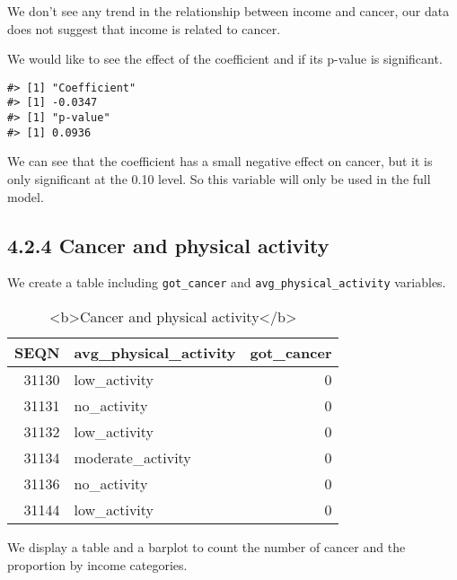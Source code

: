 \documentclass[
]{article}
\begin{document}
We don't see any trend in the relationship between income and cancer,
our data does not suggest that income is related to cancer.

We would like to see the effect of the coefficient and if its p-value is
significant.

\begin{verbatim}
#> [1] "Coefficient"
#> [1] -0.0347
#> [1] "p-value"
#> [1] 0.0936
\end{verbatim}

We can see that the coefficient has a small negative effect on cancer,
but it is only significant at the 0.10 level. So this variable will only
be used in the full model.

\hypertarget{cancer-and-physical-activity}{%
\subsection{4.2.4 Cancer and physical
activity}\label{cancer-and-physical-activity}}

We create a table including \texttt{got\_cancer} and
\texttt{avg\_physical\_activity} variables.

\begin{table}

\caption{\label{tab:unnamed-chunk-102}<b>Cancer and physical activity</b>}
\centering
\begin{tabular}[t]{r|l|r}
\hline
SEQN & avg\_physical\_activity & got\_cancer\\
\hline
31130 & low\_activity & 0\\
\hline
31131 & no\_activity & 0\\
\hline
31132 & low\_activity & 0\\
\hline
31134 & moderate\_activity & 0\\
\hline
31136 & no\_activity & 0\\
\hline
31144 & low\_activity & 0\\
\hline
\end{tabular}
\end{table}

We display a table and a barplot to count the number of cancer and the
proportion by income categories.
\end{document}
